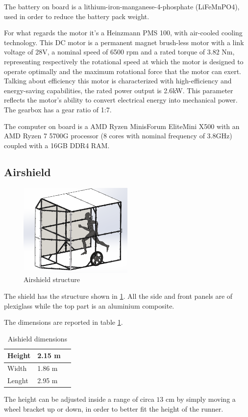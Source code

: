 \documentclass[a4paper,12pt,oneside]{book}
\begin{document}
\bigskip
The battery on board is a lithium-iron-manganese-4-phosphate (LiFeMnPO4), used in order to reduce the battery pack weight.

\bigskip
For what regards the motor it's a Heinzmann PMS 100, with air-cooled cooling technology. 
This DC motor is a permanent magnet brush-less motor with a link voltage of 28V, a nominal speed of 6500 rpm and a rated torque of 3.82 Nm, representing respectively the rotational speed at which the motor is designed to operate optimally and the maximum rotational force that the motor can exert.
Talking about efficiency this motor is characterized with high-efficiency and energy-saving capabilities, the rated power output is 2.6kW. 
This parameter reflects the motor's ability to convert electrical energy into mechanical power.
The gearbox has a gear ratio of 1:7.

\bigskip
The computer on board is a AMD Ryzen MinisForum EliteMini X500 with an AMD Ryzen 7 5700G processor (8 cores with nominal frequency of 3.8GHz) coupled with a 16GB DDR4 RAM.

\subsection*{Airshield}

\begin{figure}
	\centering
	\includegraphics[width=0.5\textwidth]{Shield_structure.png}
\caption{Airshield structure}
\label{Shield_structure}
\end{figure}

The shield has the structure shown in \ref{Shield_structure}.
All the side and front panels are of plexiglass while the top part is an aluminium composite.

The dimensions are reported in table \ref{tab:Shield_dimensions}.

\begin{table}[h]
\centering
\begin{tabular}{|p{1.5cm}|p{1.5cm}|p{1.5cm}|}
\hline
Height & 2.15 m \\
\hline
Width & 1.86 m \\
\hline
Lenght & 2.95 m \\
\hline
\end{tabular}
\caption{Aishield dimensions}
\label{tab:Shield_dimensions}
\end{table}
The height can be adjusted inside a range of circa $13$ cm by simply moving a wheel bracket up or down, in order to better fit the height of the runner.
\end{document}
